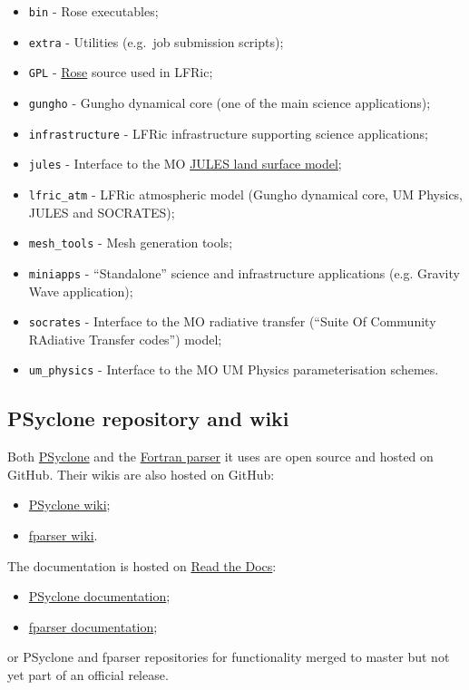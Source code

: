 \documentclass[twoside,a4paper,12pt]{article}
\begin{document}
\begin{itemize}
\item \texttt{bin} - Rose executables;
\item \texttt{extra} - Utilities (e.g.\ job submission scripts);
\item \texttt{GPL} - \href{https://github.com/metomi/rose}{Rose} source used in LFRic;
\item \texttt{gungho} - Gungho dynamical core (one of the main science applications);
\item \texttt{infrastructure} - LFRic infrastructure supporting science applications;
\item \texttt{jules} - Interface to the MO \href{https://www.metoffice.gov.uk/research/approach/collaboration/jwcrp/jules}{JULES land surface model};
\item \texttt{lfric\_atm} - LFRic atmospheric model (Gungho dynamical core, UM Physics, JULES and SOCRATES);
\item \texttt{mesh\_tools} - Mesh generation tools;
\item \texttt{miniapps} - ``Standalone'' science and infrastructure applications (e.g. Gravity Wave application);
\item \texttt{socrates} - Interface to the MO radiative transfer (``Suite Of Community RAdiative Transfer codes'') model;
\item \texttt{um\_physics} - Interface to the MO UM Physics parameterisation schemes.
\end{itemize}
%
%
\subsection{PSyclone repository and wiki}\label{psyclone_repo}

Both \href{https://github.com/stfc/PSyclone}{PSyclone} and the
\href{https://github.com/stfc/fparser}{Fortran parser} it uses are open source
and hosted on GitHub. Their wikis are also hosted on GitHub:

\begin{itemize}
\item \href{https://github.com/stfc/PSyclone/wiki}{PSyclone wiki};
\item \href{https://github.com/stfc/fparser/wiki}{fparser wiki}.
\end{itemize}

The documentation is hosted on \href{https://readthedocs.org/}{Read the Docs}:
\begin{itemize}
\item \href{https://psyclone.readthedocs.io/en/stable/}{PSyclone documentation};
\item \href{https://fparser.readthedocs.io/en/latest/}{fparser documentation};
\end{itemize}
or PSyclone and fparser repositories for functionality merged to master but not
yet part of an official release.
%
%
\end{document}

